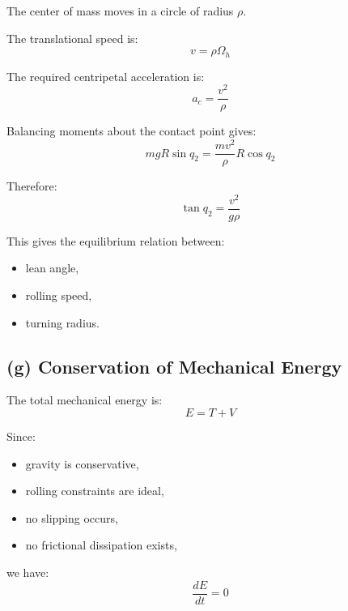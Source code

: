 The center of mass moves in a circle of radius $\rho$.

The translational speed is:
\[
v = \rho\Omega_h
\]

The required centripetal acceleration is:
\[
a_c = \frac{v^2}{\rho}
\]

Balancing moments about the contact point gives:
\[
mgR\sin q_2
=
\frac{mv^2}{\rho}R\cos q_2
\]

Therefore:
\[
\boxed{
\tan q_2
=
\frac{v^2}{g\rho}
}
\]

This gives the equilibrium relation between:
\begin{itemize}
    \item lean angle,
    \item rolling speed,
    \item turning radius.
\end{itemize}

\subsection*{(g) Conservation of Mechanical Energy}

The total mechanical energy is:
\[
E = T + V
\]

Since:
\begin{itemize}
    \item gravity is conservative,
    \item rolling constraints are ideal,
    \item no slipping occurs,
    \item no frictional dissipation exists,
\end{itemize}

we have:
\[
\frac{dE}{dt}=0
\]
